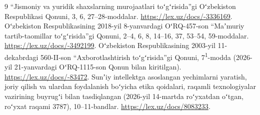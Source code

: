 \documentclass[14pt,a4paper]{extarticle}
\begin{document}
\begin{thebibliography}{9}
 “Jismoniy va yuridik shaxslarning murojaatlari toʻgʻrisida”gi Oʻzbekiston Respublikasi Qonuni, 3, 6, 27–28-moddalar. \url{https://lex.uz/docs/-3336169}.
 Oʻzbekiston Respublikasining 2018-yil 8-yanvardagi OʻRQ-457-son “Maʼmuriy tartib-taomillar toʻgʻrisida”gi Qonuni, 2–4, 6, 8, 14–16, 37, 53–54, 59-moddalar. \url{https://lex.uz/docs/-3492199}.
 Oʻzbekiston Respublikasining 2003-yil 11-dekabrdagi 560-II-son “Axborotlashtirish toʻgʻrisida”gi Qonuni, 7\textsuperscript{1}-modda (2026-yil 21-yanvardagi OʻRQ-1115-son Qonun bilan kiritilgan). \url{https://lex.uz/docs/-83472}.
 Sunʼiy intellektga asoslangan yechimlarni yaratish, joriy qilish va ulardan foydalanish boʻyicha etika qoidalari, raqamli texnologiyalar vazirining buyrugʻi bilan tasdiqlangan (2026-yil 14-martda roʻyxatdan oʻtgan, roʻyxat raqami 3787), 10–11-bandlar. \url{https://lex.uz/docs/8083233}.
\end{thebibliography}\endgroup
\end{document}
